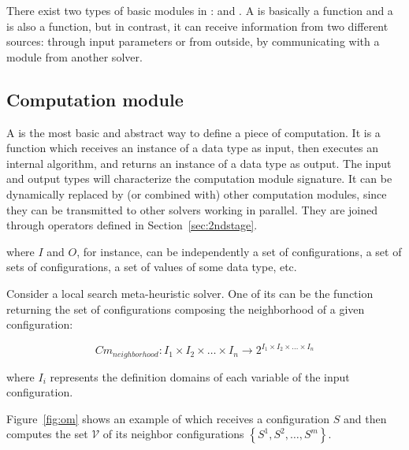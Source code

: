 There exist two types of basic modules in \posl: \INTROom{} and \INTROopch{}. A \om{} is basically a function and a \opch{} is also a function, but in contrast, it can receive information from two different sources: through input parameters or from outside, \ie by communicating with a module from another solver.

\subsection{Computation module}


A \om{} is the most basic and abstract way to define a piece of computation. It is a function which receives an instance of a \posl{} data type as input, then executes an internal algorithm, and returns an instance of a \posl{} data type as output. The input and output types will characterize the computation module signature. It can be dy\-na\-mi\-cally replaced by (or combined with) other computation modules, since they can be transmitted to other solvers working in parallel. They are joined through operators defined in Section~\ref{sec:2ndstage}.


where $I$ and $O$, for instance, can be independently a set of configurations, a set of sets of configurations, a set of values of some data type, etc.

Consider a local search meta-heuristic solver. One of its \oms{} can be the function returning the set of configurations composing the neighborhood of a given configuration:

\begin{equation*}
Cm_{neighborhood}:I_1\times I_2\times\dots\times I_n \rightarrow 2^{I_1\times I_2\times\dots\times I_n}
\end{equation*}

\noindent where $I_i$ represents the definition domains of each variable of the input confi\-gura\-tion.

Figure~\ref{fig:om} shows an example of \om{} which receives a configuration $S$ and then computes the set $\mathcal{V}$ of its neighbor configurations $\left\{S^1, S^2, \dots, S^m\right\}$.


